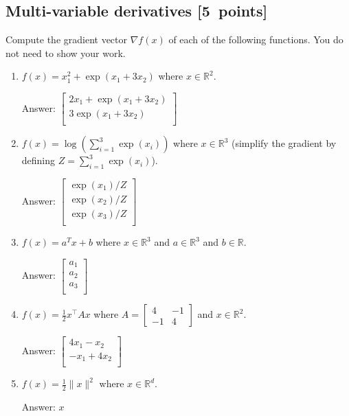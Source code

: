 \documentclass{article}
\newcommand{\blu}[1]{{\textcolor{blu}{#1}}}
\newcommand{\gre}[1]{\textcolor{gre}{#1}}
\newcommand\ans[1]{\par\gre{Answer: #1}}
\newenvironment{answer}{\par\begingroup\color{gre}Answer: }{\endgroup}
\let\ask\blu
\newcommand\pts[1]{\textcolor{pointscolour}{[#1~points]}}
\def\R{\mathbb{R}}
\newcommand{\norm}[1]{\lVert #1 \rVert}
\begin{document}
  \subsection{Multi-variable derivatives \pts{5}}
  \label{sub.multi.var}

  \ask{Compute the gradient vector $\nabla f(x)$ of each of the following functions.} You do not need to show your work.
  \begin{enumerate}
  \item $f(x) = x_1^2 + \exp(x_1 + 3x_2)$ where $x \in \R^2$.
    \begin{answer}
    $\left[\begin{array}{c}
      2x_1+\exp(x_1+3x_2)\\
      3\exp(x_1+3x_2)\\
      \end{array}\right]$
    \end{answer}
  \item $f(x) = \log\left(\sum_{i=1}^3\exp(x_i)\right)$ where $x \in \R^3$ (simplify the gradient by defining $Z = \sum_{i=1}^3\exp(x_i)$).
  \begin{answer}
    $\left[\begin{array}{c}
    \exp(x_1)/Z\\
    \exp(x_2)/Z\\
    \exp(x_3)/Z\\
    \end{array}\right]$
    \end{answer}
  \item $f(x) = a^Tx + b$ where $x \in \R^3$ and $a \in \R^3$ and $b \in \R$.
  \begin{answer}
        $\left[\begin{array}{c}
        a_1\\
        a_2\\
        a_3\\
        \end{array}\right]$
    \end{answer}
  \item $f(x) = \frac12 x^\top A x$ where $A=\left[ \begin{array}{cc}
  4 & -1 \\
  -1 & 4 \end{array} \right]$ and $x \in \mathbb{R}^2$.
  \begin{answer}
        $\left[\begin{array}{c}
        4x_1-x_2\\
        -x_1+4x_2\\
        \end{array}\right]$
   \end{answer}
  \item $f(x) = \frac{1}{2}\norm{x}^2$ where $x \in \R^d$.
  \ans{$x$}
  \end{enumerate}
\end{document}
